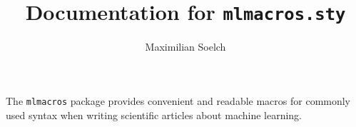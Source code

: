 \documentclass
[
]
{article}
\title{Documentation for \texttt{mlmacros.sty}}
\author{Maximilian Soelch}
\begin{document}
\maketitle
The \verb|mlmacros| package provides convenient and readable macros for commonly used syntax when writing scientific articles about machine learning.














\end{document}
